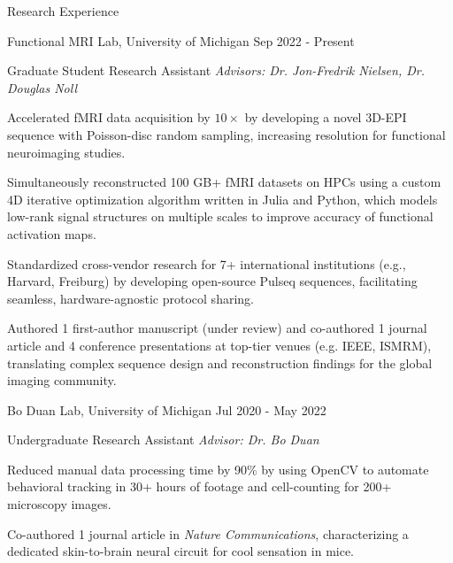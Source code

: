 \documentclass{resume}
\begin{document}
\begin{rSection}{Research Experience}
    \begin{rSubsection}{Functional MRI Lab}{, University of Michigan \hfill {Sep 2022 - Present}}
    	\item {Graduate Student Research Assistant \hfill \textit{Advisors: Dr. Jon-Fredrik Nielsen, Dr. Douglas Noll}}
    	\begin{rSubsubsection}
            \item Accelerated fMRI data acquisition by $10\times$ by developing a novel 3D-EPI sequence with Poisson-disc random sampling, increasing resolution for functional neuroimaging studies.
            \item Simultaneously reconstructed 100 GB+ fMRI datasets on HPCs using a custom 4D iterative optimization algorithm written in Julia and Python, which models low-rank signal structures on multiple scales to improve accuracy of functional activation maps.
            \item Standardized cross-vendor research for 7+ international institutions (e.g., Harvard, Freiburg) by developing open-source Pulseq sequences, facilitating seamless, hardware-agnostic protocol sharing.
            \item Authored 1 first-author manuscript (under review) and co-authored 1 journal article and 4 conference presentations at top-tier venues (e.g. IEEE, ISMRM), translating complex sequence design and reconstruction findings for the global imaging community.
    	\end{rSubsubsection}
	\end{rSubsection}

    \begin{rSubsection}{Bo Duan Lab}{, University of Michigan \hfill {Jul 2020 - May 2022}}
	\item {Undergraduate Research Assistant \hfill \textit{Advisor: Dr. Bo Duan}}
	\begin{rSubsubsection}
        \item Reduced manual data processing time by 90\% by using OpenCV to automate behavioral tracking in 30+ hours of footage and cell-counting for 200+ microscopy images.
        \item Co-authored 1 journal article in \textit{Nature Communications}, characterizing a dedicated skin-to-brain neural circuit for cool sensation in mice.
	\end{rSubsubsection}
    \end{rSubsection}
\end{rSection}
\end{document}
